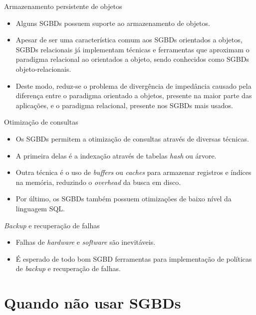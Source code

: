 \documentclass[11pt]{beamer}
\begin{document}
\begin{frame}{Armazenamento persistente de objetos}
    \begin{itemize}
        \item Alguns SGBDs possuem suporte ao armazenamento de objetos.
        \item Apesar de ser uma característica comum aos SGBDs orientados a objetos, SGBDs relacionais já implementam técnicas e ferramentas que aproximam o paradigma relacional ao orientados a objeto, sendo conhecidos como SGBDs objeto-relacionais.
        \item Deste modo, reduz-se o problema de divergência de impedância causado pela diferença entre o paradigma orientado a objetos, presente na maior parte das aplicações, e o paradigma relacional, presente nos SGBDs mais usados.
    \end{itemize}
\end{frame}

\begin{frame}{Otimização de consultas}
    \begin{itemize}
        \item Os SGBDs permitem a otimização de consultas através de diversas técnicas.
        \item A primeira delas é a indexação através de tabelas \textit{hash} ou árvore.
        \item Outra técnica é o uso de \textit{buffers} ou \textit{caches} para armazenar registros e índices na memória, reduzindo o \textit{overhead} da busca em disco.
        \item Por último, os SGBDs também possuem otimizações de baixo nível da linguagem SQL.
    \end{itemize}
\end{frame}

\begin{frame}{\textit{Backup} e recuperação de falhas}
    \begin{itemize}
        \item Falhas de \textit{hardware} e \textit{software} são inevitáveis.
        \item É esperado de todo bom SGBD ferramentas para implementação de políticas de \textit{backup} e recuperação de falhas.
    \end{itemize}
\end{frame}

\section{Quando não usar SGBDs}
\end{document}
